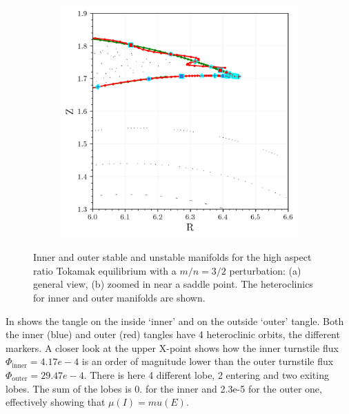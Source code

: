 \begin{figure}[h!]
\begin{subfigure}[c]{0.49\textwidth}
        \includegraphics[width=\textwidth]{images/high-aspect-ratio/closeup.png}
        \caption{}
    \end{subfigure}
    \caption{Inner and outer stable and unstable manifolds for the high aspect ratio Tokamak equilibrium with a $m/n = 3/2$ perturbation: (a) general view, (b) zoomed in near a saddle point. The heteroclinics for inner and outer manifolds are shown.}
    \label{fig:inner-outer}
\end{figure}

In  shows the tangle on the inside `inner' and on the outside `outer' tangle. Both the inner (blue) and outer (red) tangles have 4 heteroclinic orbits, the different markers. 
A closer look at the upper X-point shows how the inner turnstile flux $\Phi_\text{inner} = 4.17e-4$ is an order of magnitude lower than the outer turnstile flux $\Phi_\text{outer} = 29.47e-4$. There is here 4 different lobe, 2 entering and two exiting lobes. The sum of the lobes is 0. for the inner and 2.3e-5 for the outer one, effectively showing that $\mu(I) = mu(E)$.